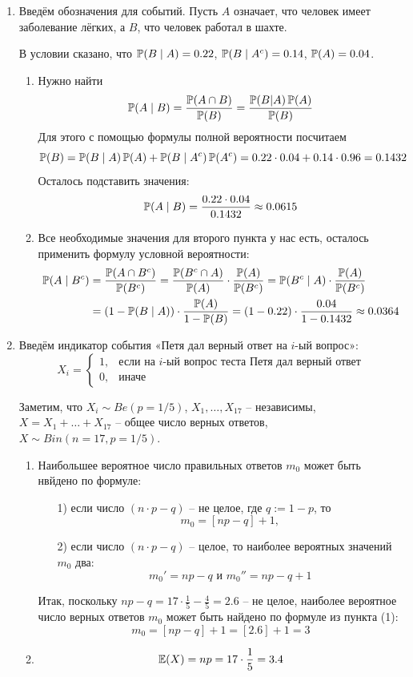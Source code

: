 \begin{enumerate}
\item Введём обозначения для событий.
Пусть $A$ означает, что человек имеет заболевание лёгких,
а $B$, что человек работал в шахте.

В условии сказано, что $\P(B \mid A) = 0.22$, $\P(B \mid A^c) = 0.14$, $\P(A) = 0.04$.
\begin{enumerate}
\item Нужно найти
\[
\P(A \mid B) = \frac{\P(A\cap B)}{\P (B)} = \frac{\P(B|A)\P(A)}{\P(B)}
\]
Для этого с помощью формулы полной вероятности посчитаем
\[
\P (B) = \P (B \mid A) \P(A) + \P (B \mid A^c) \P (A^c) = 0.22 \cdot 0.04 + 0.14 \cdot 0.96 = 0.1432
\]
Осталось подставить значения:
\[
\P(A \mid B) = \frac{0.22 \cdot 0.04}{0.1432} \approx 0.0615
\]

\item Все необходимые значения для второго пункта у нас есть,
осталось применить формулу условной вероятности:
\begin{align*}
\P  (A \mid B^c) &=  \frac{\P(A\cap B^c)}{\P (B^c)} =  \frac{\P (B^c \cap A)}{\P(A)} \cdot \frac{\P(A)}{\P (B^c)} = \P (B^c \mid A) \cdot \frac{\P(A)}{\P (B^c)} \\
&= (1-\P (B \mid A)) \cdot \frac{\P(A)}{1-\P (B)} = (1-0.22) \cdot \frac{0.04}{1-0.1432} \approx 0.0364
\end{align*}
\end{enumerate}
\item Введём индикатор события «Петя дал верный ответ на $i$-ый вопрос»:
\[
X_i =
\begin{cases}
1, & \text{если на } i \text{-ый вопрос теста Петя дал верный ответ} \\
0, & \text{иначе}
\end{cases}
\]

Заметим, что $X_i \sim Be\left(p = 1/5 \right)$, $X_1, \ldots, X_{17}$ – независимы,
$X = X_1 + \ldots + X_{17}$ – общее число верных ответов,
$X \sim Bin\left(n=17, p=1/5\right)$.

\begin{enumerate}
\item Наибольшее вероятное число правильных ответов $m_0$ может быть нвйдено по формуле:
\begin{enumerate}
\item[1)] если число $(n\cdot p - q)$ – не целое, где $q:=1-p$, то
\[
m_0 = [np-q] +1,
\]
\item[2)] если число  $(n\cdot p - q)$ – целое, то наиболее вероятных значений $m_0$ два:
\[
m_0' = np-q \text{ и } m_0'' = np-q+1
\]
\end{enumerate}
Итак, поскольку $np-q = 17\cdot\frac{1}{5} - \frac{4}{5} = 2.6$ – не целое, наиболее вероятное число верных ответов $m_0$ может быть найдено по формуле из пункта (1):
\[
m_0 = [np-q] +1 = [2.6] + 1 = 3
\]
\item \[\E(X) = np = 17 \cdot \frac{1}{5}=3.4\]


\end{enumerate}
\end{enumerate}
